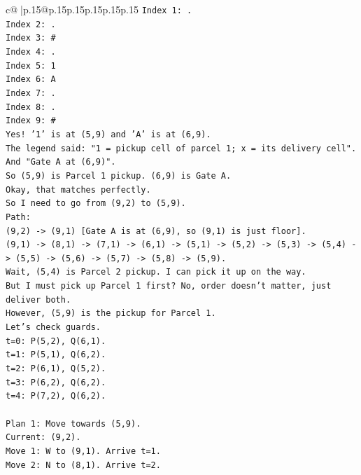 \documentclass{article}
\begin{document}
{\begin{supertabular}{c@{$\;$}|p{.15\linewidth}@{}p{.15\linewidth}p{.15\linewidth}p{.15\linewidth}p{.15\linewidth}p{.15\linewidth}}
{{{\texttt{Index 1: .} \\
\texttt{Index 2: .} \\
\texttt{Index 3: \#} \\
\texttt{Index 4: .} \\
\texttt{Index 5: 1} \\
\texttt{Index 6: A} \\
\texttt{Index 7: .} \\
\texttt{Index 8: .} \\
\texttt{Index 9: \#} \\
\texttt{Yes! '1' is at (5,9) and 'A' is at (6,9).} \\
\texttt{The legend said: "1 = pickup cell of parcel 1; x = its delivery cell".} \\
\texttt{And "Gate A at (6,9)".} \\
\texttt{So (5,9) is Parcel 1 pickup. (6,9) is Gate A.} \\
\texttt{Okay, that matches perfectly.} \\
\texttt{So I need to go from (9,2) to (5,9).} \\
\texttt{Path:} \\
\texttt{(9,2) {-}> (9,1) {[}Gate A is at (6,9), so (9,1) is just floor{]}.} \\
\texttt{(9,1) {-}> (8,1) {-}> (7,1) {-}> (6,1) {-}> (5,1) {-}> (5,2) {-}> (5,3) {-}> (5,4) {-}> (5,5) {-}> (5,6) {-}> (5,7) {-}> (5,8) {-}> (5,9).} \\
\texttt{Wait, (5,4) is Parcel 2 pickup. I can pick it up on the way.} \\
\texttt{But I must pick up Parcel 1 first? No, order doesn't matter, just deliver both.} \\
\texttt{However, (5,9) is the pickup for Parcel 1.} \\
\texttt{Let's check guards.} \\
\texttt{t=0: P(5,2), Q(6,1).} \\
\texttt{t=1: P(5,1), Q(6,2).} \\
\texttt{t=2: P(6,1), Q(5,2).} \\
\texttt{t=3: P(6,2), Q(6,2).} \\
\texttt{t=4: P(7,2), Q(6,2).} \\
\\ 
\texttt{Plan 1: Move towards (5,9).} \\
\texttt{Current: (9,2).} \\
\texttt{Move 1: W to (9,1). Arrive t=1.} \\
\texttt{Move 2: N to (8,1). Arrive t=2.} \\
}}}
\end{supertabular}}
\end{document}

